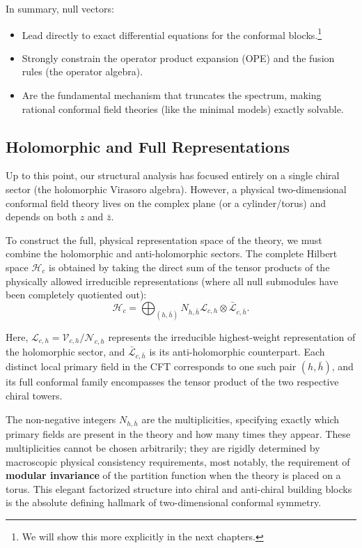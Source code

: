In summary, null vectors:
\begin{itemize}
    \item Lead directly to exact differential equations for the conformal blocks.\footnote{We will show this more explicitly in the next chapters.}
    \item Strongly constrain the operator product expansion (OPE) and the fusion rules (the operator algebra).
    \item Are the fundamental mechanism that truncates the spectrum, making rational conformal field theories (like the minimal models) exactly solvable.
\end{itemize}

\subsection{Holomorphic and Full Representations}

Up to this point, our structural analysis has focused entirely on a single chiral sector (the holomorphic Virasoro algebra). However, a physical two-dimensional conformal field theory lives on the complex plane (or a cylinder/torus) and depends on both $z$ and $\bar{z}$.

To construct the full, physical representation space of the theory, we must combine the holomorphic and anti-holomorphic sectors. The complete Hilbert space $\mathcal{H}_c$ is obtained by taking the direct sum of the tensor products of the physically allowed irreducible representations (where all null submodules have been completely quotiented out):
\[
    \mathcal{H}_c = \bigoplus_{(h, \bar{h})} N_{h, \bar{h}} \mathcal{L}_{c,h} \otimes \bar{\mathcal{L}}_{c, \bar{h}}.
\]

Here, $\mathcal{L}_{c,h} = \mathcal{V}_{c,h} / \mathcal{N}_{c,h}$ represents the irreducible highest-weight representation of the holomorphic sector, and $\bar{\mathcal{L}}_{c, \bar{h}}$ is its anti-holomorphic counterpart. Each distinct local primary field in the CFT corresponds to one such pair $(h, \bar{h})$, and its full conformal family encompasses the tensor product of the two respective chiral towers.

The non-negative integers $N_{h, \bar{h}}$ are the multiplicities, specifying exactly which primary fields are present in the theory and how many times they appear. These multiplicities cannot be chosen arbitrarily; they are rigidly determined by macroscopic physical consistency requirements, most notably, the requirement of \textbf{modular invariance} of the partition function when the theory is placed on a torus. This elegant factorized structure into chiral and anti-chiral building blocks is the absolute defining hallmark of two-dimensional conformal symmetry.